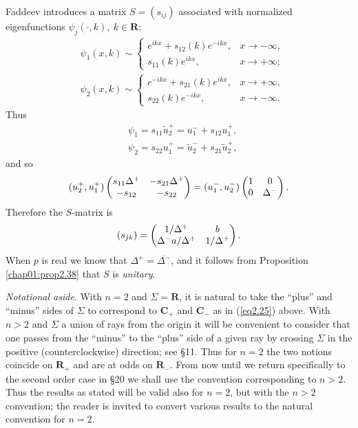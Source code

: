 \documentclass{surv-l}
\theoremstyle{plain}
\theoremstyle{definition}
\numberwithin{equation}{chapter}
\begin{document}
Faddeev \cite{Fa1} introduces a matrix $S=(s_{ij})$ associated with normalized eigenfunctions $\psi_{j}(\cdot, k),\ k\in \mathbf{R}$:
\begin{align*}
&\psi_{1}(x,k)\sim\left\{\begin{array}{ll}
e^{ikx}+s_{12}(k)e^{-ikx}, & x\rightarrow-\infty,\\
s_{11}(k)e^{ikx}, & x\rightarrow+\infty;
\end{array}\right.\\
&\psi_{2}(x, k)\sim\left\{\begin{array}{ll}
e^{-ikx}+s_{21}(k)e^{ikx}, & x\rightarrow+\infty,\\
s_{22}(k)e^{-ikx}, & x\rightarrow-\infty.
\end{array}\right.
\end{align*}
Thus
\begin{align*}
&\psi_{1}=s_{11}\tilde{u}_{2}^{+}=u_{1}^{-}+s_{12}u_{1}^{+},\\
&\psi_{2}=s_{22}u_{1}^{+}=\tilde{u}_{2}^{-}+s_{21}\tilde{u}_{2}^{+},
\end{align*}
and so
\begin{equation*}
(u_{2}^{+}, u_{1}^{+}) \left(\begin{array}{@{}cc@{}}
s_{11}\Delta^{+} & -s_{21}\Delta^{+}\\
-s_{12} & -s_{22}
\end{array}\right)=(u_{1}^{-}, u_{2}^{-}) \left(\begin{array}{@{}cc@{}}
1 & 0\\
0 & \Delta^{-}
\end{array}\right).
\end{equation*}
Therefore the $S$-matrix is
\begin{equation*}
(s_{jk})=\left(\begin{array}{@{}cc@{}}
1/\Delta^{+} & b\\
\Delta^{-}a/\Delta^{+} & 1/\Delta^{+}
\end{array}\right).
\end{equation*}
When $p$ is real we know that $\Delta^{+}=\overline{\Delta^{-}}$, and it follows from Proposition \ref{chap01:prop2.38} that $S$ is \emph{unitary}.

\emph{Notational aside}. With $n=2$ and $\Sigma=\mathbf{R}$, it is natural to take the ``plus'' and ``minus'' sides of $\Sigma$ to correspond to $\mathbf{C}_{+}$ and $\mathbf{C}_{-}$ as in (\ref{eq2.25}) above. With $n >2$ and $\Sigma$ a union of rays from the origin it will be convenient to consider that one passes from the ``minus'' to the ``plus'' side of a given ray by crossing $\Sigma$ in the positive (counterclockwise) direction; see \S 11. Thus for $n=2$ the two notions coincide on $\mathbf{R}_{+}$ and are at odds on $\mathbf{R}_{-}$. From now until we return specifically to the second order case in \S 20 we shall use the convention corresponding to $n>2$. Thus the results as stated will be valid also for $n=2$, but with the $n >2$ convention; the reader is invited to convert various results to the natural convention for $n=2$.
\end{document}
